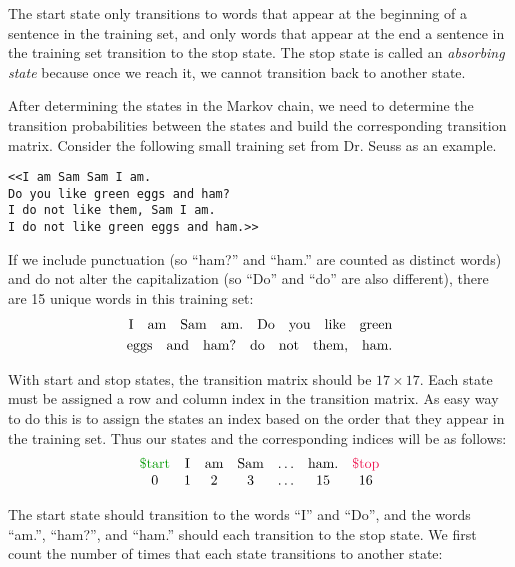 The start state only transitions to words that appear at the beginning of a sentence in the training set, and only words that appear at the end a sentence in the training set transition to the stop state.
The stop state is called an \emph{absorbing state} because once we reach it, we cannot transition back to another state.

After determining the states in the Markov chain, we need to determine the transition probabilities between the states and build the corresponding transition matrix.
Consider the following small training set from Dr. Seuss as an example.

\begin{lstlisting}
<<I am Sam Sam I am.
Do you like green eggs and ham?
I do not like them, Sam I am.
I do not like green eggs and ham.>>
\end{lstlisting}

If we include punctuation (so ``ham?'' and ``ham.'' are counted as distinct words) and do not alter the capitalization (so ``Do'' and ``do'' are also different), there are 15 unique words in this training set:
%
\begin{align*}
\text{I\quad am\quad Sam\quad am.\quad Do\quad you\quad like\quad green}
\\
\text{eggs\quad and\quad ham?\quad do\quad not\quad them,\quad ham.}
\end{align*}

With start and stop states, the transition matrix should be $17 \times 17$.
Each state must be assigned a row and column index in the transition matrix.
As easy way to do this is to assign the states an index based on the order that they appear in the training set.
Thus our states and the corresponding indices will be as follows:
%
\begin{align*}
\begin{array}{ccccccc}
\text{\textcolor[rgb]{0,.6,0}{\$tart}} & \text{I} & \text{am} & \text{Sam} & \ldots & \text{ham.} & \text{\textcolor{red}{\$top}}
\\
0 & 1 & 2 & 3 & \ldots & 15 & 16
\end{array}
\end{align*}

The start state should transition to the words ``I'' and ``Do'', and the words ``am.'', ``ham?'', and ``ham.'' should each transition to the stop state.
We first count the number of times that each state transitions to another state:

